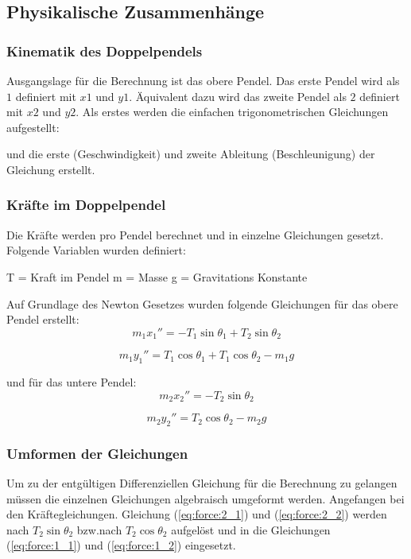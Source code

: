\documentclass[12pt]{article}
\begin{document}
\subsection{Physikalische Zusammenhänge}

\subsubsection{Kinematik des Doppelpendels}
Ausgangslage für die Berechnung ist das obere Pendel. Das erste Pendel wird als $1$ definiert mit $x1$ und $y1$. Äquivalent dazu wird das zweite Pendel als $2$ definiert mit $x2$ und $y2$.
Als erstes werden die einfachen trigonometrischen Gleichungen aufgestellt:


und die erste (Geschwindigkeit) und zweite Ableitung (Beschleunigung) der Gleichung erstellt.


\subsubsection{Kräfte im Doppelpendel}
Die Kräfte werden pro Pendel berechnet und in einzelne Gleichungen gesetzt.
Folgende Variablen wurden definiert:

T = Kraft im Pendel
m = Masse
g = Gravitations Konstante

Auf Grundlage des Newton Gesetzes wurden folgende Gleichungen für das obere Pendel erstellt:
\begin{equation} \label{eq:force:1_1}
	m_1 x_1'' = -T_1\sin\theta_1 + T_2\sin\theta_2
\end{equation}

\begin{equation} \label{eq:force:1_2}
	m_1 y_1'' = T_1\cos\theta_1 + T_1\cos\theta_2 - m_1 g
\end{equation}

und für das untere Pendel:
\begin{equation} \label{eq:force:2_1}
	m_2 x_2'' = -T_2\sin\theta_2
\end{equation}

\begin{equation} \label{eq:force:2_2}
	m_2 y_2'' = T_2\cos\theta_2 - m_2 g
\end{equation}

\subsubsection{Umformen der Gleichungen}
Um zu der entgültigen Differenziellen Gleichung für die Berechnung zu gelangen müssen die einzelnen Gleichungen algebraisch umgeformt werden.
Angefangen bei den Kräftegleichungen. Gleichung (\ref{eq:force:2_1}) und (\ref{eq:force:2_2}) werden nach $T_2\sin\theta_2$ bzw.nach $T_2\cos\theta_2$ aufgelöst und in die Gleichungen (\ref{eq:force:1_1}) und (\ref{eq:force:1_2}) eingesetzt.
\end{document}
